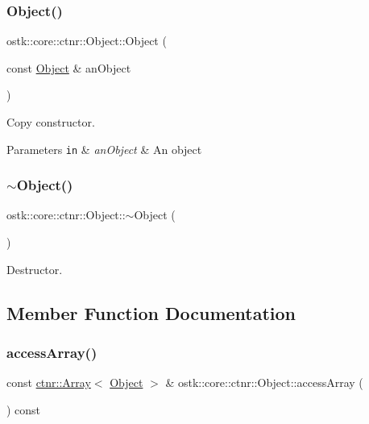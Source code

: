 \subsubsection{\texorpdfstring{Object()}{Object()}\hspace{0.1cm}{\footnotesize\ttfamily [3/3]}}
{\footnotesize\ttfamily ostk\+::core\+::ctnr\+::\+Object\+::\+Object (\begin{DoxyParamCaption}\item[{const \hyperlink{classostk_1_1core_1_1ctnr_1_1_object}{Object} \&}]{an\+Object }\end{DoxyParamCaption})}



Copy constructor. 


\begin{DoxyParams}[1]{Parameters}
\mbox{\tt in}  & {\em an\+Object} & An object \\
\hline
\end{DoxyParams}
\mbox{\label{classostk_1_1core_1_1ctnr_1_1_object_aef383174a379dcd563b2071a7db9b9f5}} 
\subsubsection{\texorpdfstring{$\sim$\+Object()}{~Object()}}
{\footnotesize\ttfamily ostk\+::core\+::ctnr\+::\+Object\+::$\sim$\+Object (\begin{DoxyParamCaption}{ }\end{DoxyParamCaption})}



Destructor. 



\subsection{Member Function Documentation}
\mbox{\label{classostk_1_1core_1_1ctnr_1_1_object_a6f9a8d8e89675935c259cd02c4eb1f46}} 
\subsubsection{\texorpdfstring{access\+Array()}{accessArray()}\hspace{0.1cm}{\footnotesize\ttfamily [1/2]}}
{\footnotesize\ttfamily const \hyperlink{classostk_1_1core_1_1ctnr_1_1_array}{ctnr\+::\+Array}$<$ \hyperlink{classostk_1_1core_1_1ctnr_1_1_object}{Object} $>$ \& ostk\+::core\+::ctnr\+::\+Object\+::access\+Array (\begin{DoxyParamCaption}{ }\end{DoxyParamCaption}) const}

